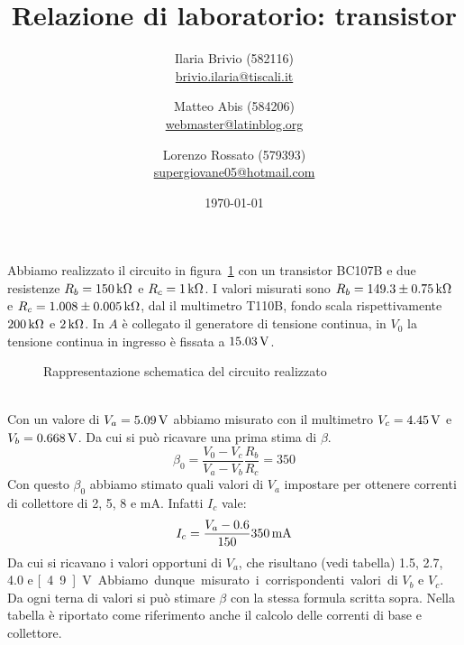 \documentclass[italian,a4paper]{article}
\begin{document}
\title{Relazione di laboratorio: transistor}
\author{\normalsize Ilaria Brivio (582116)\\%
\normalsize \url{brivio.ilaria@tiscali.it}%
\and %
\normalsize Matteo Abis (584206)\\ %
\normalsize \url{webmaster@latinblog.org}
\and %
\normalsize Lorenzo Rossato (579393)\\ %
\normalsize \url{supergiovane05@hotmail.com}}
\date{\today}
\maketitle
\noindent
Abbiamo realizzato il circuito in figura~\ref{fig:circuito} con un transistor BC107B e due
resistenze $R_b = \unit[150]{k\ohm}$ e $R_c = \unit[1]{k\ohm}$. I
valori misurati sono $R_b = \unit[149.3 \pm 0.75]{k\ohm}$ e $R_c = \unit[1.008 \pm
0.005]{k\ohm}$, dal il multimetro T110B, fondo scala
rispettivamente $\unit[200]{k\ohm}$ e $\unit[2]{k\ohm}$. In $A$ è collegato
il generatore di tensione continua, in $V_0$ la tensione continua in ingresso
è fissata a $\unit[15.03]{V}$.
\begin{figure}[h]
    \caption{Rappresentazione schematica del circuito realizzato}
    \label{fig:circuito}
    \begin{center}
        
    \end{center}
\end{figure}\\
Con un valore di $V_a = \unit[5.09]{V}$
abbiamo misurato con il multimetro $V_c = \unit[4.45]{V}$ e $V_b =
\unit[0.668]{V}$. Da cui si può ricavare una prima stima di $\beta$.
\begin{equation*}
    \beta_0 = \dfrac{V_{0} - V_c}{V_a - V_b}\dfrac{R_b}{R_c} = 350
\end{equation*}
Con questo $\beta_0$ abbiamo stimato quali valori di $V_a$ impostare per ottenere
correnti di collettore di 2, 5, 8 e \unit[10]{mA}. 
Infatti $I_c$ vale:
\begin{equation*}
    I_c = \unit[\dfrac{V_a - 0.6}{150}350]{mA}
\end{equation*}
Da cui si ricavano i valori opportuni di $V_a$, che risultano (vedi
tabella) 1.5, 2.7, 4.0 e \unit[4.9]{V}.
Abbiamo dunque misurato i corrispondenti valori di $V_b$ e $V_c$.
Da ogni terna di valori si può stimare $\beta$ con la stessa formula
scritta sopra. Nella tabella è riportato come riferimento anche il calcolo
delle correnti di base e collettore.
\end{document}
